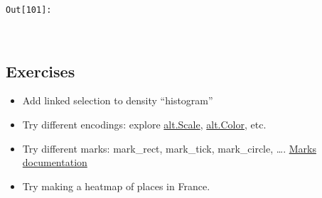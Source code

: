 \documentclass[11pt]{article}
\providecommand{\tightlist}{%
      \setlength{\itemsep}{0pt}\setlength{\parskip}{0pt}}
\begin{document}
\texttt{\color{outcolor}Out[{\color{outcolor}101}]:}
    
    \begin{center}
    \end{center}
    { \hspace*{\fill} \\}
    

    \subsection{Exercises}\label{exercises}

\begin{itemize}
\tightlist
\item
  Add linked selection to density ``histogram''
\item
  Try different encodings: explore
  \href{https://altair-viz.github.io/user_guide/generated/core/altair.Scale.html\#altair.Scale}{alt.Scale},
  \href{https://altair-viz.github.io/user_guide/generated/channels/altair.Color.html\#altair.Color}{alt.Color},
  etc.
\item
  Try different marks: mark\_rect, mark\_tick, mark\_circle, \ldots{}.
  \href{https://altair-viz.github.io/user_guide/marks.html}{Marks
  documentation}
\item
  Try making a heatmap of places in France.
\end{itemize}
\end{document}
